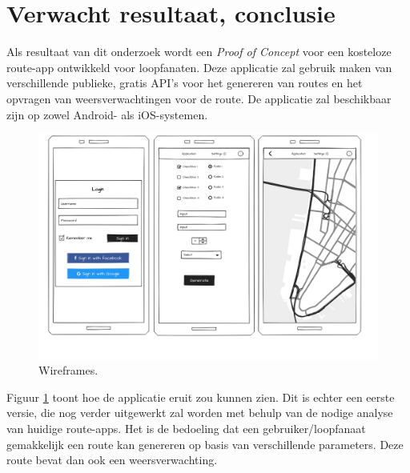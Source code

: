 \section{Verwacht resultaat, conclusie}%
\label{sec:verwachte_resultaten}

Als resultaat van dit onderzoek wordt een \emph{Proof of Concept}
voor een kosteloze route-app ontwikkeld voor loopfanaten.
Deze applicatie zal gebruik maken van verschillende publieke, gratis API's voor het
genereren van routes en het opvragen van weersverwachtingen voor de route.
De applicatie zal beschikbaar zijn op zowel Android- als iOS-systemen.


\begin{figure}[h!]
    \includegraphics[width=\linewidth]{./graphics/wireframes.png}
    \caption{Wireframes.}
    \label{fig:wireframes}
\end{figure}

Figuur \ref{fig:wireframes} toont hoe de applicatie eruit zou kunnen zien. 
Dit is echter een eerste versie,
die nog verder uitgewerkt zal worden met behulp van de nodige analyse van huidige route-apps.
Het is de bedoeling dat een gebruiker/loopfanaat gemakkelijk een route kan genereren op basis van verschillende parameters. Deze route bevat dan ook een weersverwachting. 
